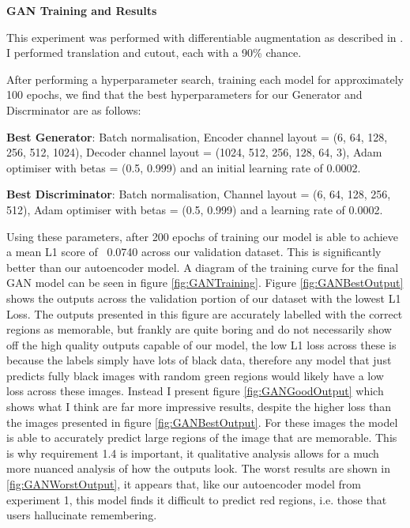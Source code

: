 \documentclass{UoYCSproject}
\begin{document}
\textbf{GAN Training and Results}

This experiment was performed with differentiable augmentation as described in \cite{zhao2020differentiable}. I performed translation and cutout, each with a 90\% chance.

After performing a hyperparameter search, training each model for approximately 100 epochs, we find that the best hyperparameters for our Generator and Discrminator are as follows:

\textbf{Best Generator}: Batch normalisation, Encoder channel layout = (6, 64, 128, 256, 512, 1024), Decoder channel layout = (1024, 512, 256, 128, 64, 3), Adam optimiser with betas = (0.5, 0.999) and an initial learning rate of 0.0002.

\textbf{Best Discriminator}: Batch normalisation, Channel layout = (6, 64, 128, 256, 512), Adam optimiser with betas = (0.5, 0.999) and a learning rate of 0.0002.

Using these parameters, after 200 epochs of training our model is able to achieve a mean L1 score of ~0.0740 across our validation dataset. This is significantly better than our autoencoder model. A diagram of the training curve for the final GAN model can be seen in figure \ref{fig:GANTraining}. 
Figure \ref{fig:GANBestOutput} shows the outputs across the validation portion of our dataset with the lowest L1 Loss. The outputs presented in this figure are accurately labelled with the correct regions as memorable, but frankly are quite boring and do not necessarily show off the high quality outputs capable of our model, the low L1 loss across these is because the labels simply have lots of black data, therefore any model that just predicts fully black images with random green regions would likely have a low loss across these images. 
Instead I present figure \ref{fig:GANGoodOutput} which shows what I think are far more impressive results, despite the higher loss than the images presented in figure \ref{fig:GANBestOutput}. For these images the model is able to accurately predict large regions of the image that are memorable. This is why requirement 1.4 is important, it qualitative analysis allows for a much more nuanced analysis of how the outputs look.  
The worst results are shown in \ref{fig:GANWorstOutput}, it appears that, like our autoencoder model from experiment 1, this model finds it difficult to predict red regions, i.e. those that users hallucinate remembering.
\end{document}
